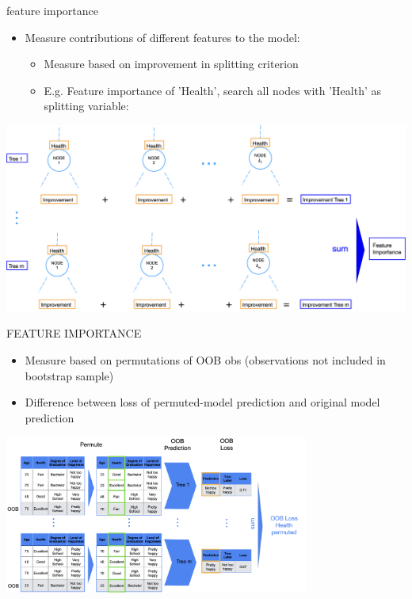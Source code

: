 \documentclass[11pt,compress,t,notes=noshow, xcolor=table]{beamer}
\begin{document}
\begin{vbframe}{feature importance}
\begin{itemize}
\item \small Measure contributions of different features to the model:
    \begin{itemize}
        \item \small Measure based on improvement in splitting criterion
        \item \small E.g. Feature importance of 'Health', search all nodes with 'Health' as splitting variable:
    \end{itemize}
\end{itemize}    


\includegraphics[width = \textwidth]{slides/forests/figure_man/nutshell-random-forest-feature-importance_split.png}
\end{vbframe}

\begin{vbframe}{FEATURE IMPORTANCE}
\begin{itemize}
    \item \small Measure based on permutations of OOB obs (observations not included in bootstrap sample)
    \item \small Difference between loss of permuted-model prediction and original model prediction
\end{itemize}


\begin{center}
    \includegraphics[width = 0.75\textwidth]{slides/forests/figure_man/nutshell-randomforest-OOB_1.png}
\end{center}

\end{vbframe}
\end{document}

